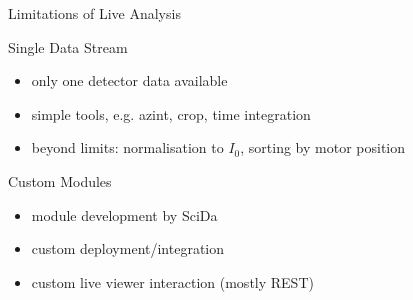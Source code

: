 \documentclass[aspectratio=169]{beamer}
\begin{document}
\begin{frame}{Limitations of Live Analysis}
 \begin{block}{Single Data Stream}
  \begin{itemize}
   \item only one detector data available
   \item simple tools, e.g. azint, crop, time integration
   \item beyond limits: normalisation to $I_0$, sorting by motor position
  \end{itemize}
 \end{block}
 \begin{block}{Custom Modules}
  \begin{itemize}
   \item module development by SciDa
   \item custom deployment/integration
   \item custom live viewer interaction (mostly REST)
  \end{itemize}
 \end{block}
\end{frame}
\end{document}

